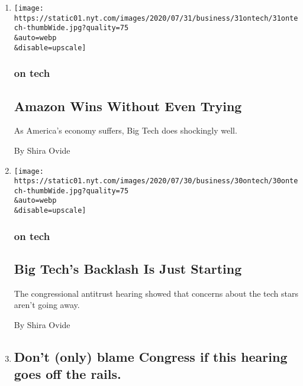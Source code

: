 \begin{enumerate}
\def\labelenumi{\arabic{enumi}.}
\item
  \href{/2020/07/31/technology/amazon-earnings.html}{}

  \texttt{[image: https://static01.nyt.com/images/2020/07/31/business/31ontech/31ontech-thumbWide.jpg?quality=75\\\&auto=webp\\\&disable=upscale]}

  \hypertarget{on-tech}{%
  \subsubsection{on tech}\label{on-tech}}

  \hypertarget{amazon-wins-without-even-trying}{%
  \subsection{Amazon Wins Without Even
  Trying}\label{amazon-wins-without-even-trying}}

  As America's economy suffers, Big Tech does shockingly well.

  By Shira Ovide
\item
  \href{/2020/07/30/technology/big-tech-backlash.html}{}

  \texttt{[image: https://static01.nyt.com/images/2020/07/30/business/30ontech/30ontech-thumbWide.jpg?quality=75\\\&auto=webp\\\&disable=upscale]}

  \hypertarget{on-tech-1}{%
  \subsubsection{on tech}\label{on-tech-1}}

  \hypertarget{big-techs-backlash-is-just-starting}{%
  \subsection{Big Tech's Backlash Is Just
  Starting}\label{big-techs-backlash-is-just-starting}}

  The congressional antitrust hearing showed that concerns about the
  tech stars aren't going away.

  By Shira Ovide
\item
  \href{/live/2020/07/29/technology/tech-ceos-hearing-testimony/dont-only-blame-congress-if-this-hearing-goes-off-the-rails}{}

  \hypertarget{dont-only-blame-congress-if-this-hearing-goes-off-the-rails}{%
  \subsection{Don't (only) blame Congress if this hearing goes off the
  rails.}\label{dont-only-blame-congress-if-this-hearing-goes-off-the-rails}}


\end{enumerate}
